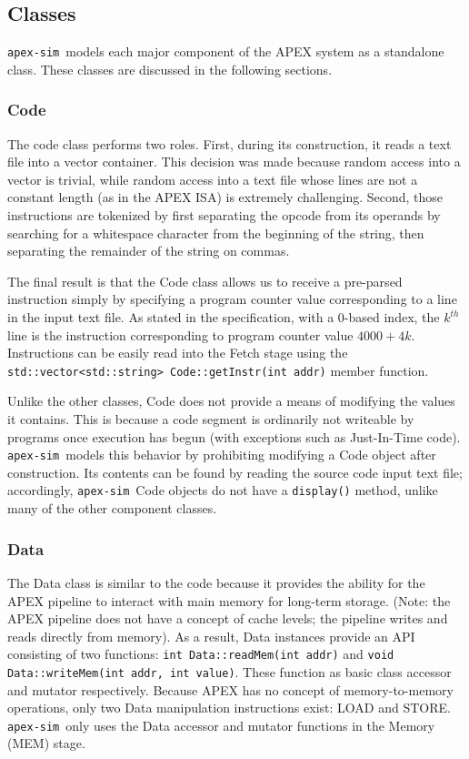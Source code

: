 \documentclass[12pt]{article}
\newcommand{\codename}[0]{\texttt{apex-sim}~}
\begin{document}
\subsection{Classes}
\label{sec:classes}
\codename models each major component of the APEX system as a standalone class. These classes are discussed in the following sections.

\subsubsection{Code}
The code class performs two roles.
First, during its construction, it reads a text file into a vector container. This decision was made because random access into a vector is trivial, while random access into a text file whose lines are not a constant length (as in the APEX ISA) is extremely challenging.
Second, those instructions are tokenized by first separating the opcode from its operands by searching for a whitespace character from the beginning of the string, then separating the remainder of the string on commas.

The final result is that the Code class allows us to receive a pre-parsed instruction simply by specifying a program counter value corresponding to a line in the input text file.
As stated in the specification, with a 0-based index, the $k^{th}$ line is the instruction corresponding to program counter value $4000 + 4k$.
Instructions can be easily read into the Fetch stage using the \texttt{std::vector<std::string> Code::getInstr(int addr)} member function.

Unlike the other classes, Code does not provide a means of modifying the values it contains. This is because a code segment is ordinarily not writeable by programs once execution has begun (with exceptions such as Just-In-Time code). \codename models this behavior by prohibiting modifying a Code object after construction. Its contents can be found by reading the source code input text file; accordingly, \codename Code objects do not have a \texttt{display()} method, unlike many of the other component classes.

\subsubsection{Data}
The Data class is similar to the code because it provides the ability for the APEX pipeline to interact with main memory for long-term storage.
(Note: the APEX pipeline does not have a concept of cache levels; the pipeline writes and reads directly from memory).
As a result, Data instances provide an API consisting of two functions: \texttt{int Data::readMem(int addr)} and \texttt{void Data::writeMem(int addr, int value)}.
These function as basic class accessor and mutator respectively.
Because APEX has no concept of memory-to-memory operations, only two Data manipulation instructions exist: LOAD and STORE.
\codename only uses the Data accessor and mutator functions in the Memory (MEM) stage.
\end{document}
